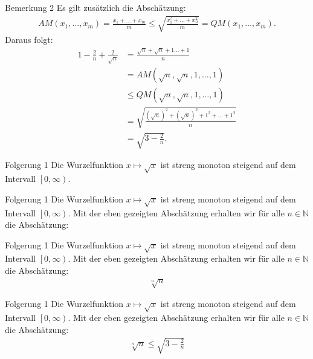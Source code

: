 \documentclass[10pt]{beamer}
\def\bN{\mathbb{N}}
\begin{document}
\begin{frame}{Bemerkung 2}
    Es gilt zusätzlich die Abschätzung:
    \begin{align*}
        AM( x_{1}, \ldots, x_{m} )
        = \frac{x_{1} + \ldots + x_{m}}{m}
        \leq \sqrt{\frac{x_{1}^{2} + \ldots + x_{n}^{2}}{m}} 
      	= QM( x_{1}, \ldots, x_{m} ).
    \end{align*}
    Daraus folgt:
    \begin{align*}
        1 - \frac{2}{n} + \frac{2}{\sqrt{n}}
        & = \frac{\sqrt{n} + \sqrt{n} + 1 \ldots + 1}{n} \\
        & = AM(\sqrt{n}, \sqrt{n}, 1, \ldots, 1) \\
        & \leq QM(\sqrt{n}, \sqrt{n}, 1, \ldots, 1) \\
        & = \sqrt{\frac{\left( \sqrt{n} \right)^{2} + \left( \sqrt{n} \right)^{2} + 1^{2} + \ldots + 1^{2}}{n}} \\
        & = \sqrt{3 - \frac{2}{n}}.
    \end{align*}
\end{frame}



\begin{frame}{Folgerung 1}
    Die Wurzelfunktion \( x \mapsto \sqrt{x} \) ist streng monoton steigend auf dem Intervall \( \left[0, \infty \right) \). 
\end{frame}



\begin{frame}{Folgerung 1}
    Die Wurzelfunktion \( x \mapsto \sqrt{x} \) ist streng monoton steigend auf dem Intervall \( \left[0, \infty \right) \). Mit der eben gezeigten Abschätzung erhalten wir für alle \( n \in \bN \) die Abschätzung: 
\end{frame}



\begin{frame}{Folgerung 1}
    Die Wurzelfunktion \( x \mapsto \sqrt{x} \) ist streng monoton steigend auf dem Intervall \( \left[0, \infty \right) \). Mit der eben gezeigten Abschätzung erhalten wir für alle \( n \in \bN \) die Abschätzung:
    \begin{align*}
        \sqrt[n]{n}
    \end{align*}
\end{frame}



\begin{frame}{Folgerung 1}
    Die Wurzelfunktion \( x \mapsto \sqrt{x} \) ist streng monoton steigend auf dem Intervall \( \left[0, \infty \right) \). Mit der eben gezeigten Abschätzung erhalten wir für alle \( n \in \bN \) die Abschätzung:
    \begin{align*}
        \sqrt[n]{n}
        \leq \sqrt{3 - \frac{2}{n}}
    \end{align*}
\end{frame}
\end{document}
